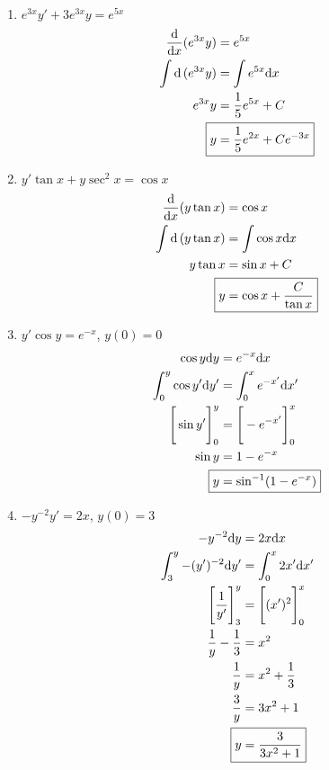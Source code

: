 \documentclass{article}
\begin{document}
\begin{multicols*}{2}
\begin{enumerate}
\vfill
\item $e^{3x} y' + 3e^{3x}y = e^{5x}$
\begin{equation*}
\begin{aligned}
\frac{\dd}{\dd x}(e^{3x}y) &= e^{5x} \\
\int\dd\,(e^{3x}y) &= \int e^{5x}\dd x \\
e^{3x}y &= \frac{1}{5}e^{5x} + C \\
\Aboxed{y &= \frac{1}{5}e^{2x} + Ce^{-3x}}
\end{aligned}
\end{equation*}

\vfill
\item $y' \tan x + y\sec^2 x = \cos x$
\begin{equation*}
\begin{aligned}
\frac{\dd}{\dd x}(y\tan x) &= \cos x \\
\int\dd\,(y\tan x) &= \int\cos x\dd x \\
y\tan x &= \sin x + C \\
\Aboxed{y &= \cos x + \frac{C}{\tan x}}
\end{aligned}
\end{equation*}

\vfill
\item $y' \cos y = e^{-x}$, $y(0) = 0$
\begin{equation*}
\begin{aligned}
\cos y \dd y &= e^{-x}\dd x \\
\int_0^y\cos y' \dd y' &= \int_0^x e^{-x'}\dd x' \\
\Bigg[\sin y'\Bigg]_0^y &= \Bigg[-e^{-x'}\Bigg]_0^x \\
\sin y &= 1 - e^{-x} \\
\Aboxed{y &= \sin^{-1}(1-e^{-x})}
\end{aligned}
\end{equation*}
\vfill\null

\columnbreak
\item $-y^{-2}y' = 2x$, $y(0) = 3$
\begin{equation*}
\begin{aligned}
-y^{-2}\dd y &= 2x\dd x \\
\int_3^y -(y')^{-2}\dd y' &= \int_0^x 2x'\dd x' \\
\Bigg[\frac{1}{y'}\Bigg]_3^y &= \Bigg[(x')^2\Bigg]_0^x \\
\frac{1}{y} - \frac{1}{3} &= x^2 \\
\frac{1}{y} &= x^2 + \frac{1}{3} \\
\frac{3}{y} &= 3x^2 + 1 \\
\Aboxed{y &= \frac{3}{3x^2 + 1}}
\end{aligned}
\end{equation*}

\end{enumerate}
\end{multicols*}
\end{document}
